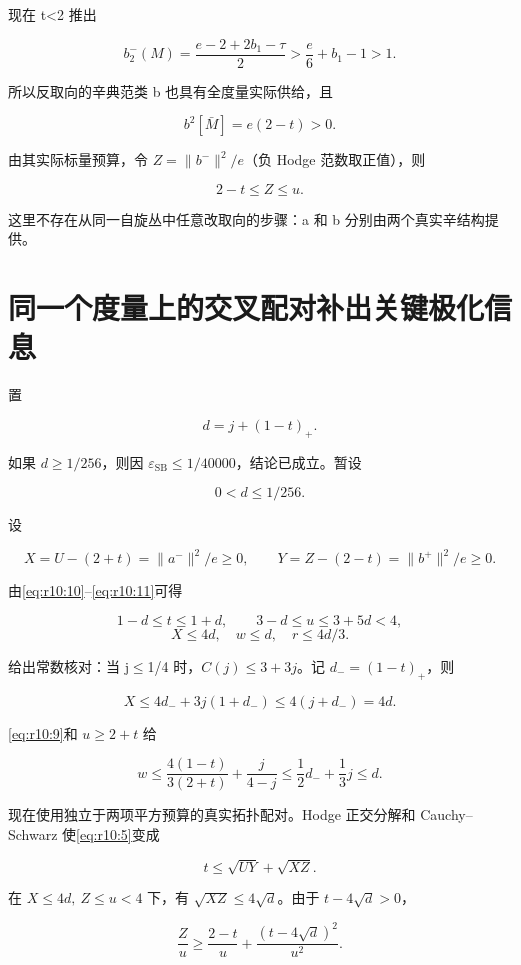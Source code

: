 \documentclass[UTF8,11pt,fontset=none]{ctexart}
\begin{document}
现在 t\textless2 推出

\[
b_2^-(M)=\frac{e-2+2b_1-\tau}{2}
>\frac e6+b_1-1>1.
\]

所以反取向的辛典范类 b 也具有全度量实际供给，且

\[
b^2[\bar M]=e(2-t)>0.
\]

由其实际标量预算，令 \(Z=\|b^-\|^2/e\)（负 Hodge 范数取正值），则

\[
2-t\le Z\le u.
\tag{10.12}\label{eq:r10:12}
\]

这里不存在从同一自旋丛中任意改取向的步骤：a 和 b 分别由两个真实辛结构提供。

\section{同一个度量上的交叉配对补出关键极化信息}\label{ch10:ux540cux4e00ux4e2aux5ea6ux91cfux4e0aux7684ux4ea4ux53c9ux914dux5bf9ux8865ux51faux5173ux952eux6781ux5316ux4fe1ux606f}

置

\[
d=j+(1-t)_+.
\]

如果 \(d\ge1/256\)，则因 \(\varepsilon_{\mathrm{SB}}\le1/40000\)，结论已成立。暂设

\[
0<d\le1/256.
\tag{10.13}\label{eq:r10:13}
\]

设

\[
X=U-(2+t)=\|a^-\|^2/e\ge0,
\qquad Y=Z-(2-t)=\|b^+\|^2/e\ge0.
\]

由\eqref{eq:r10:10}--\eqref{eq:r10:11}可得

\[
1-d\le t\le1+d,\qquad 3-d\le u\le3+5d<4,
\] \[
\boxed{X\le4d,\quad w\le d,\quad r\le4d/3.}
\tag{10.14}\label{eq:r10:14}
\]

给出常数核对：当 j\(\le\)1/4 时，\(C(j)\le3+3j\)。记 \(d_-=(1-t)_+\)，则

\[
X\le4d_-+3j(1+d_-)\le4(j+d_-)=4d.
\]

\eqref{eq:r10:9}和 \(u\ge2+t\) 给

\[
w\le\frac{4(1-t)}{3(2+t)}+\frac{j}{4-j}
\le\frac12d_-+\frac13j\le d.
\]

现在使用独立于两项平方预算的真实拓扑配对。Hodge 正交分解和 Cauchy--Schwarz 使\eqref{eq:r10:5}变成

\[
\boxed{t\le\sqrt{UY}+\sqrt{XZ}.}
\tag{10.15}\label{eq:r10:15}
\]

在 \(X\le4d,\ Z\le u<4\) 下，有 \(\sqrt{XZ}\le4\sqrt d\)。由于 \(t-4\sqrt d>0\)，

\[
\frac Zu\ge\frac{2-t}{u}
+\frac{(t-4\sqrt d)^2}{u^2}.
\tag{10.16}\label{eq:r10:16}
\]
\end{document}

